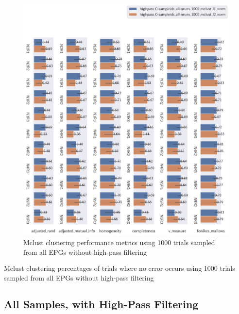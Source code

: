 \begin{theappendices}
\begin{figure}[htbp]
\centering
\includegraphics[width=\textwidth]{./figures/clust_comparison/highpass_0-sampleids_all-nruns_1000_mclust.pdf}
\caption{Mclust clustering performance metrics using 1000 trials sampled from all EPGs without high-pass filtering}
\label{appendix:fig:highpass_0-sampleids_all-nruns_1000_mclust}
\end{figure}

\begin{table}[htbp]
\centering
{}
\caption{Mclust clustering percentages of trials where no error occurs using 1000 trials sampled from all EPGs without high-pass filtering}
\label{appendix:table:highpass_0-sampleids_all-nruns_1000_mclust}
\end{table}

\FloatBarrier
\subsection{All Samples, with High-Pass Filtering}


\end{theappendices}
